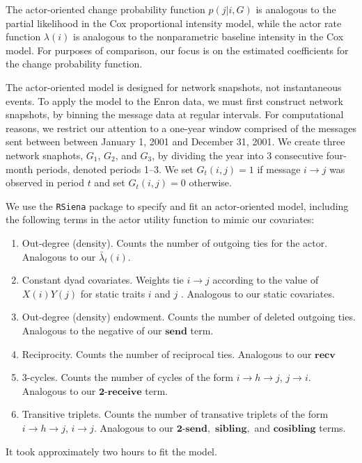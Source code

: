 \documentclass[final]{statsoc}
\begin{document}
The actor-oriented change probability function $p(j | i, G)$ is analogous to
the partial likelihood in the Cox proportional intensity model, while the
actor rate function $\lambda(i)$ is analogous to the nonparametric baseline
intensity in the Cox model.  For purposes of comparison, our focus is on the
estimated coefficients for the change probability function.

The actor-oriented model is designed for network snapshots, not instantaneous
events.  To apply the model to the Enron data, we must first construct network
snapshots, by binning the message data at regular intervals.  For
computational reasons, we restrict our attention to a one-year window
comprised of the messages sent between between January 1, 2001
and December 31, 2001.  We create three network
snaphots, $G_1$, $G_2$, and $G_3$, by dividing the year into $3$ consecutive
four-month periods, denoted periods 1--3.  We set $G_t(i,j) = 1$ if
message $i \to j$ was observed in period $t$ and set $G_t(i,j) = 0$ otherwise.

We use the \texttt{RSiena} package to specify and fit an actor-oriented model,
including the following terms in the actor utility function to mimic our
covariates:

\begin{enumerate}
  \item Out-degree (density). Counts the number of outgoing ties for the actor.
Analogous to our $\bar \lambda_t(i)$.
  \item Constant dyad covariates.  Weights tie $i \to j$ according to
the value of $X(i) Y(j)$ for static traits $i$ and $j$ .  Analogous to our
static covariates.
  \item Out-degree (density) endowment.  Counts the number of deleted outgoing
ties.  Analogous to the negative of our $\textbf{send}$ term.
  \item Reciprocity.  Counts the number of reciprocal ties.  Analogous to our $\textbf{recv}$
  \item 3-cycles.  Counts the number of cycles of the form $i \to h \to j$, $j
\to i$.  Analogous to our $\textbf{2-receive}$ term.
  \item Transitive triplets.  Counts the number of transative triplets of the
form $i \to h \to j$, $i \to j$.  Analogous to our $\textbf{2-send},$
    $\textbf{sibling},$ and $\textbf{cosibling}$ terms.
\end{enumerate}

\noindent
It took approximately two hours to fit the model.
\end{document}
